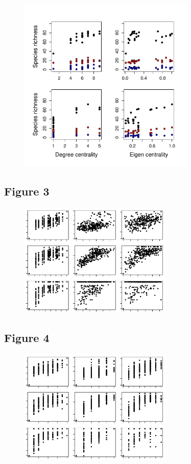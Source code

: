 \documentclass[12pt]{article}
\begin{document}
\begin{figure}[ht!]
\centering\includegraphics[width=0.75\textwidth]{Centrality.pdf}
\end{figure}

\newpage

\subsection*{Figure 3}

\begin{figure}[ht!]
\centering\includegraphics[width=0.65\textwidth]{BetaGeoDist.pdf}
\end{figure}

\newpage

\subsection*{Figure 4}

\begin{figure}[ht!]
\centering\includegraphics[width=0.65\textwidth]{BetaTopoDist.pdf}
\end{figure}

\newpage
\end{document}
